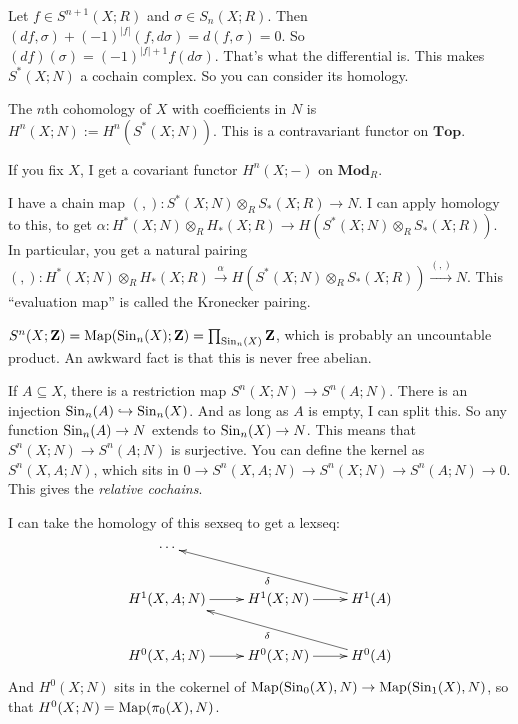 Let $f\in S^{n+1}(X;R)$ and $\sigma\in S_n(X;R)$. Then $(df,\sigma)+(-1)^{|f|}(f,d\sigma)=d(f,\sigma)=0$. So $(df)(\sigma)=(-1)^{|f|+1}f(d\sigma)$. That's what the differential is. This makes $S^\ast(X;N)$ a cochain complex. So you can consider its homology.
\begin{definition}
The $n$th cohomology of $X$ with coefficients in $N$ is $ H^n(X;N):= H^n(S^\ast(X;N))$. This is a contravariant functor on $\mathbf{Top}$.
\end{definition}
If you fix $X$, I get a covariant functor $ H^n(X;-)$ on $\mathbf{Mod}_R$.
\begin{construction}
I have a chain map $(,):S^\ast(X;N)\otimes_R S_\ast(X;R)\to N$. I can apply homology to this, to get $\alpha: H^\ast(X;N)\otimes_R H_\ast(X;R)\to H(S^\ast(X;N)\otimes_R S_\ast(X;R))$. In particular, you get a natural pairing $(,): H^\ast(X;N)\otimes_R H_\ast(X;R)\xrightarrow{\alpha} H(S^\ast(X;N)\otimes_R S_\ast(X;R))\xrightarrow{(,)}N$. This ``evaluation map'' is called the Kronecker pairing.
\end{construction}
\begin{warning}
$S^n(X;\mathbf Z)=\operatorname{Map}(\mathrm{Sin}_n(X);\mathbf Z)=\prod_{\mathrm{Sin}_n(X)}\mathbf Z$, which is probably an uncountable product. An awkward fact is that this is never free abelian.
\end{warning}
\begin{construction}
If $A\subseteq X$, there is a restriction map $S^n(X;N)\to S^n(A;N)$. There is an injection $\mathrm{Sin}_n(A)\hookrightarrow \mathrm{Sin}_n(X)$. And as long as $A$ is empty, I can split this. So any function $\mathrm{Sin}_n(A)\to N$ extends to $\mathrm{Sin}_n(X)\to N$. This means that $S^n(X;N)\to S^n(A;N)$ is surjective. You can define the kernel as $S^n(X,A;N)$, which sits in $0\to S^n(X,A;N)\to S^n(X;N)\to S^n(A;N)\to 0$. This gives the \emph{relative cochains}.
\end{construction}
I can take the homology of this sexseq to get a lexseq:
\begin{equation*}
\xymatrix{
	\cdots & & \\
	 H^1(X,A;N)\ar[r] & H^1(X;N)\ar[r] & H^1(A)\ar[ull]^{\delta}\\
	 H^0(X,A;N)\ar[r] & H^0(X;N)\ar[r] & H^0(A)\ar[ull]^{\delta}
}
\end{equation*}
And $ H^0(X;N)$ sits in the cokernel of $\operatorname{Map}(\mathrm{Sin}_0(X),N)\to \operatorname{Map}(\mathrm{Sin}_1(X),N)$, so that $ H^0(X;N)=\operatorname{Map}(\pi_0(X),N)$.
